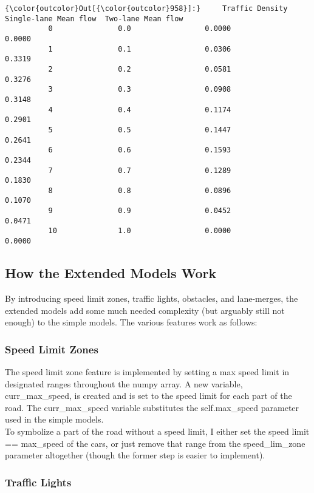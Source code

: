 \documentclass[11pt]{article}
\begin{document}
\begin{Verbatim}[commandchars=\\\{\}]
{\color{outcolor}Out[{\color{outcolor}958}]:}     Traffic Density  Single-lane Mean flow  Two-lane Mean flow
          0               0.0                 0.0000              0.0000
          1               0.1                 0.0306              0.3319
          2               0.2                 0.0581              0.3276
          3               0.3                 0.0908              0.3148
          4               0.4                 0.1174              0.2901
          5               0.5                 0.1447              0.2641
          6               0.6                 0.1593              0.2344
          7               0.7                 0.1289              0.1830
          8               0.8                 0.0896              0.1070
          9               0.9                 0.0452              0.0471
          10              1.0                 0.0000              0.0000
\end{Verbatim}
            
    \subsection{How the Extended Models Work}

By introducing speed limit zones, traffic lights, obstacles, and
lane-merges, the extended models add some much needed complexity (but
arguably still not enough) to the simple models. The various features
work as follows:

\subsubsection{Speed Limit Zones}

The speed limit zone feature is implemented by setting a max speed limit
in designated ranges throughout the numpy array. A new variable,
curr\_max\_speed, is created and is set to the speed limit for each part
of the road. The curr\_max\_speed variable substitutes the
self.max\_speed parameter used in the simple models.\\

To symbolize a part of the road without a speed limit, I either set the
speed limit == max\_speed of the cars, or just remove that range from
the speed\_lim\_zone parameter altogether (though the former step is
easier to implement).

\subsubsection{Traffic Lights}
\end{document}
